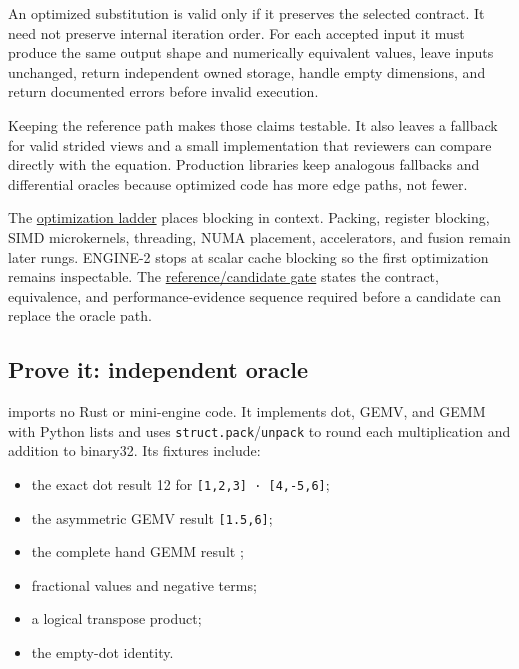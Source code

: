 \documentclass[
  10pt,
]{article}
\providecommand{\tightlist}{%
  \setlength{\itemsep}{0pt}\setlength{\parskip}{0pt}}
\begin{document}
An optimized substitution is valid only if it preserves the selected
contract. It need not preserve internal iteration order. For each
accepted input it must produce the same output shape and numerically
equivalent values, leave inputs unchanged, return independent owned
storage, handle empty dimensions, and return documented errors before
invalid execution.

Keeping the reference path makes those claims testable. It also leaves a
fallback for valid strided views and a small implementation that
reviewers can compare directly with the equation. Production libraries
keep analogous fallbacks and differential oracles because optimized code
has more edge paths, not fewer.

The
\href{https://github.com/hermonai/inside-the-llm-engine/blob/astra-visual-rewrite/diagrams/linear/optimization-ladder.txt}{optimization
ladder} places blocking in context. Packing, register blocking, SIMD
microkernels, threading, NUMA placement, accelerators, and fusion remain
later rungs. ENGINE-2 stops at scalar cache blocking so the first
optimization remains inspectable. The
\href{https://github.com/hermonai/inside-the-llm-engine/blob/astra-visual-rewrite/diagrams/linear/reference-candidate-gates.txt}{reference/candidate
gate} states the contract, equivalence, and performance-evidence
sequence required before a candidate can replace the oracle path.

\subsection{Prove it: independent
oracle}\label{prove-it-independent-oracle}

\texttt{}
imports no Rust or mini-engine code. It implements dot, GEMV, and GEMM
with Python lists and uses \texttt{struct.pack}/\texttt{unpack} to round
each multiplication and addition to binary32. Its fixtures include:

\begin{itemize}
\tightlist
\item
  the exact dot result 12 for \texttt{{[}1,2,3{]}\ ·\ {[}4,-5,6{]}};
\item
  the asymmetric GEMV result \texttt{{[}1.5,6{]}};
\item
  the complete hand GEMM result \texttt{\seqsplit{[[58,64],[139,154]]}};
\item
  fractional values and negative terms;
\item
  a logical transpose product;
\item
  the empty-dot identity.
\end{itemize}
\end{document}
